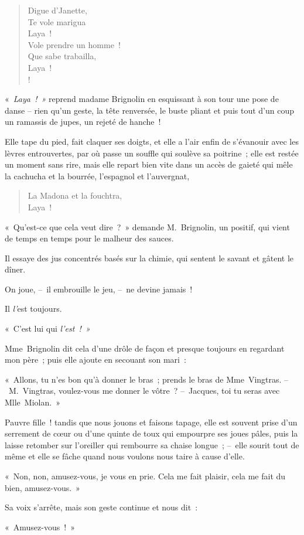 \documentclass[french,twoside]{book} %
\begin{document}
\begin{verse}
Digue d’Janette,\\
Te vole marigua\\
Laya !\\
Vole prendre un homme !\\
Que sabe trabailla,\\
Laya !\\!
\end{verse}
\noindent « \emph{Laya ! »} reprend madame Brignolin en esquissant à son tour une pose de danse – rien qu’un geste, la tête renversée, le buste pliant et puis tout d’un coup un ramassis de jupes, un rejeté de hanche !\par
Elle tape du pied, fait claquer ses doigts, et elle a l’air enfin de s’évanouir avec les lèvres entrouvertes, par où passe un souffle qui soulève sa poitrine ; elle est restée un moment sans rire, mais elle repart bien vite dans un accès de gaieté qui mêle la cachucha et la bourrée, l’espagnol et l’auvergnat,\par

\begin{verse}
La Madona et la fouchtra,\\
Laya !\\
\end{verse}
\noindent « Qu’est-ce que cela veut dire ? » demande M. Brignolin, un positif, qui vient de temps en temps pour le malheur des sauces.\par
Il essaye des jus concentrés basés sur la chimie, qui sentent le savant et gâtent le dîner.\par
On joue, – il embrouille le jeu, – ne devine jamais !\par
Il\emph{ l’}est toujours.\par
« C’est lui qui\emph{ l’est ! »}\par
Mme Brignolin dit cela d’une drôle de façon et presque toujours en regardant mon père ; puis elle ajoute en secouant son mari :\par
« Allons, tu n’es bon qu’à donner le bras ; prends le bras de Mme Vingtras. – M. Vingtras, voulez-vous me donner le vôtre ? – Jacques, toi tu seras avec Mlle Miolan. »\par
\bigbreak
\noindent Pauvre fille ! tandis que nous jouons et faisons tapage, elle est souvent prise d’un serrement de cœur ou d’une quinte de toux qui empourpre ses joues pâles, puis la laisse retomber sur l’oreiller qui rembourre sa chaise longue ; – elle sourit tout de même et elle se fâche quand nous voulons nous taire à cause d’elle.\par
« Non, non, amusez-vous, je vous en prie. Cela me fait plaisir, cela me fait du bien, amusez-vous. »\par
Sa voix s’arrête, mais son geste continue et nous dit :\par
« Amusez-vous ! »\par
\end{document}

